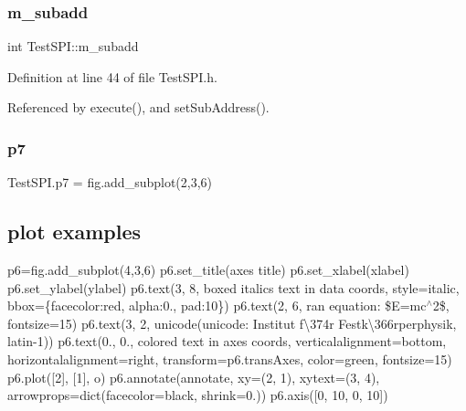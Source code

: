 \subsubsection{\texorpdfstring{m\+\_\+subadd}{m\_subadd}}
{\footnotesize\ttfamily int Test\+S\+P\+I\+::m\+\_\+subadd\hspace{0.3cm}{\ttfamily [private]}}



Definition at line 44 of file Test\+S\+P\+I.\+h.



Referenced by execute(), and set\+Sub\+Address().

\mbox{\label{classTestSPI_a8bbe85cbd3103cebe821dc87f0c01008}} 
\subsubsection{\texorpdfstring{p7}{p7}}
{\footnotesize\ttfamily Test\+S\+P\+I.\+p7 = fig.\+add\+\_\+subplot(2,3,6)}



\subsection*{plot examples}

p6=fig.\+add\+\_\+subplot(4,3,6) p6.\+set\+\_\+title(\textquotesingle{}axes title\textquotesingle{}) p6.\+set\+\_\+xlabel(\textquotesingle{}xlabel\textquotesingle{}) p6.\+set\+\_\+ylabel(\textquotesingle{}ylabel\textquotesingle{}) p6.\+text(3, 8, \textquotesingle{}boxed italics text in data coords\textquotesingle{}, style=\textquotesingle{}italic\textquotesingle{}, bbox=\{\textquotesingle{}facecolor\textquotesingle{}\+:\textquotesingle{}red\textquotesingle{}, \textquotesingle{}alpha\textquotesingle{}\+:0., \textquotesingle{}pad\textquotesingle{}\+:10\}) p6.\+text(2, 6, r\textquotesingle{}an equation\+: \$E=mc$^\wedge$2\$\textquotesingle{}, fontsize=15) p6.\+text(3, 2, unicode(\textquotesingle{}unicode\+: Institut f\textbackslash{}374r Festk\textbackslash{}366rperphysik\textquotesingle{}, \textquotesingle{}latin-\/1\textquotesingle{})) p6.\+text(0., 0., \textquotesingle{}colored text in axes coords\textquotesingle{}, verticalalignment=\textquotesingle{}bottom\textquotesingle{}, horizontalalignment=\textquotesingle{}right\textquotesingle{}, transform=p6.\+trans\+Axes, color=\textquotesingle{}green\textquotesingle{}, fontsize=15) p6.\+plot(\mbox{[}2\mbox{]}, \mbox{[}1\mbox{]}, \textquotesingle{}o\textquotesingle{}) p6.\+annotate(\textquotesingle{}annotate\textquotesingle{}, xy=(2, 1), xytext=(3, 4), arrowprops=dict(facecolor=\textquotesingle{}black\textquotesingle{}, shrink=0.)) p6.\+axis(\mbox{[}0, 10, 0, 10\mbox{]}) 



